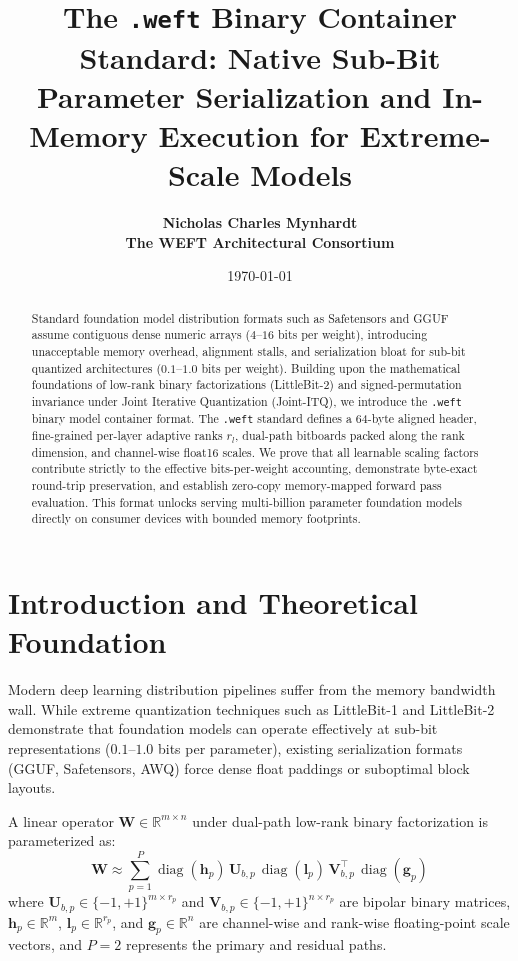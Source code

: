 \documentclass[11pt,a4paper]{article}
\title{\textbf{The \texttt{.weft} Binary Container Standard: Native Sub-Bit Parameter Serialization and In-Memory Execution for Extreme-Scale Models}}
\author{
  \textbf{Nicholas Charles Mynhardt} \\
  \textbf{The WEFT Architectural Consortium}
}
\date{\today}
\begin{document}
\maketitle

\begin{abstract}
Standard foundation model distribution formats such as Safetensors and GGUF assume contiguous dense numeric arrays ($4$--$16$ bits per weight), introducing unacceptable memory overhead, alignment stalls, and serialization bloat for sub-bit quantized architectures ($0.1$--$1.0$ bits per weight). Building upon the mathematical foundations of low-rank binary factorizations (LittleBit-2) and signed-permutation invariance under Joint Iterative Quantization (Joint-ITQ), we introduce the \texttt{.weft} binary model container format. The \texttt{.weft} standard defines a 64-byte aligned header, fine-grained per-layer adaptive ranks $r_l$, dual-path bitboards packed along the rank dimension, and channel-wise float16 scales. We prove that all learnable scaling factors contribute strictly to the effective bits-per-weight accounting, demonstrate byte-exact round-trip preservation, and establish zero-copy memory-mapped forward pass evaluation. This format unlocks serving multi-billion parameter foundation models directly on consumer devices with bounded memory footprints.
\end{abstract}

\section{Introduction and Theoretical Foundation}
Modern deep learning distribution pipelines suffer from the memory bandwidth wall. While extreme quantization techniques such as LittleBit-1 and LittleBit-2 demonstrate that foundation models can operate effectively at sub-bit representations ($0.1$--$1.0$ bits per parameter), existing serialization formats (GGUF, Safetensors, AWQ) force dense float paddings or suboptimal block layouts.

A linear operator $\mathbf{W} \in \mathbb{R}^{m \times n}$ under dual-path low-rank binary factorization is parameterized as:
\begin{equation}
\mathbf{W} \approx \sum_{p=1}^P \operatorname{diag}(\mathbf{h}_p) \, \mathbf{U}_{b,p} \, \operatorname{diag}(\mathbf{l}_p) \, \mathbf{V}_{b,p}^\top \, \operatorname{diag}(\mathbf{g}_p)
\end{equation}
where $\mathbf{U}_{b,p} \in \{-1, +1\}^{m \times r_p}$ and $\mathbf{V}_{b,p} \in \{-1, +1\}^{n \times r_p}$ are bipolar binary matrices, $\mathbf{h}_p \in \mathbb{R}^m$, $\mathbf{l}_p \in \mathbb{R}^{r_p}$, and $\mathbf{g}_p \in \mathbb{R}^n$ are channel-wise and rank-wise floating-point scale vectors, and $P=2$ represents the primary and residual paths.
\end{document}
